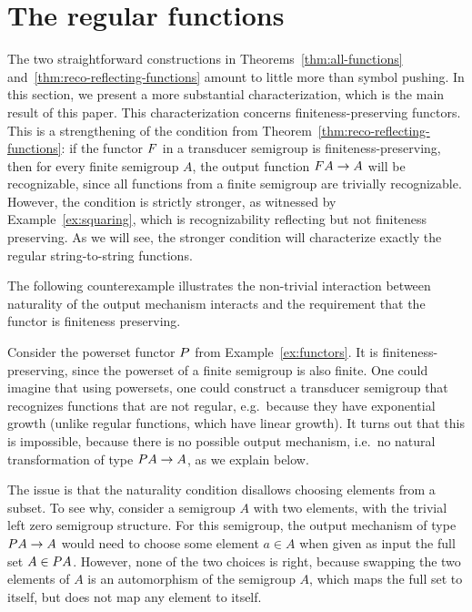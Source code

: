 \section{The regular functions}
\label{sec:reg-char}
The two straightforward constructions in Theorems~\ref{thm:all-functions} and~\ref{thm:reco-reflecting-functions}  amount to little more than symbol pushing. In this section, we present a more substantial characterization, which is the main result of this paper.
This characterization concerns finiteness-preserving functors.
This is a strengthening of the condition from Theorem~\ref{thm:reco-reflecting-functions}: if the functor $\functor$ in a transducer semigroup is finiteness-preserving, then for every finite semigroup $A$, the output function $\functor A \to A$ will be recognizable, since all functions from a finite semigroup are trivially recognizable.  However, the condition is strictly stronger, as witnessed by Example~\ref{ex:squaring}, which is recognizability reflecting but not finiteness preserving. As we will see, the stronger condition will characterize exactly the regular string-to-string functions.

The following counterexample illustrates the non-trivial interaction between naturality of the output mechanism interacts and the requirement that 
the functor is finiteness preserving.

\begin{example}
    Consider the powerset functor $\powerset$ from Example~\ref{ex:functors}. It is finiteness-preserving, since the powerset of a finite semigroup is also finite. One could imagine that using powersets, one could construct a transducer semigroup that recognizes functions that are not regular, e.g.~because they have exponential growth (unlike regular functions, which have linear growth). It turns out that this is impossible, because there is no possible output mechanism, i.e.~no natural transformation of type $\powerset A \to A$, as we explain below.

    The issue is that the naturality condition disallows choosing elements from a subset.  To see why, consider a semigroup $A$ with two elements, with the trivial left zero semigroup structure. For this semigroup, the output mechanism of type $\powerset A \to A$ would need to choose some element $a \in A$ when given as input the full set $A \in \powerset A$. However, none of the two choices is right, because swapping the two elements of $A$ is an automorphism of the semigroup $A$, which maps the full set to itself, but does not map any element to itself.
\end{example}

